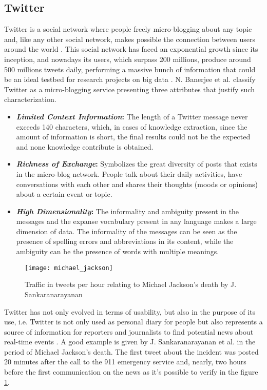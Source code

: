 \subsection{Twitter}
Twitter is a social network where people freely micro-blogging about any topic and, like any other social network, makes possible the connection between users around the world \cite{kn:Sriram2010}. This social network has faced an exponential growth since its inception, and nowadays its users, which surpass 200 millions, produce around 500 millions tweets daily, performing a massive bunch of information that could be an ideal testbed for research projects on big data \cite{kn:Lipizzi2015,kn:Goonetilleke2014}. N. Banerjee et al. \cite{kn:Banerjee2012} classify Twitter as a micro-blogging service presenting three attributes that justify such characterization.

\begin{itemize}
\item \textbf{\textit{Limited Context Information}:} The length of a Twitter message never exceeds 140 characters, which, in cases of knowledge extraction, since the amount of information is short, the final results could not be the expected and none knowledge contribute is obtained.
\item \textbf{\textit{Richness of Exchange}:} Symbolizes the great diversity of posts that exists in the micro-blog network. People talk about their daily activities, have conversations with each other and shares their thoughts (moods or opinions) about a certain event or topic.
\item \textbf{\textit{High Dimensionality}:} The informality and ambiguity present in the messages and the expanse vocabulary present in any language makes a large dimension of data. The informality of the messages can be seen as the presence of spelling errors and abbreviations in its content, while the ambiguity can be the presence of words with multiple meanings.
\end{itemize}

\begin{figure}
  \centering
    \texttt{[image: michael\_jackson]}
    \caption{Traffic in tweets per hour relating to Michael Jackson’s death by J. Sankaranarayanan \cite{kn:Sankaranarayanan2009}}
    \label{fig:michael_jackson}
\end{figure}

Twitter has not only evolved in terms of usability, but also in the purpose of its use, i.e. Twitter is not only used as personal diary for people but also represents a source of information for reporters and journalists to find potential news about real-time events \cite{kn:Sriram2010}. A good example is given by J. Sankaranarayanan et al. \cite{kn:Sankaranarayanan2009} in the period of Michael Jackson's death. The first tweet about the incident was posted 20 minutes after the call to the 911 emergency service and, nearly, two hours before the first communication on the news as it's possible to verify in the figure \ref{fig:michael_jackson}.

